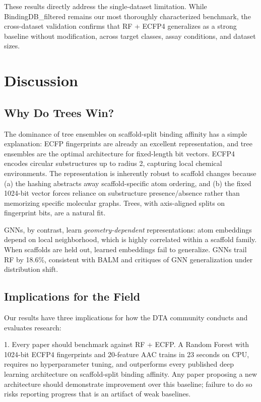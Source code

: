 \documentclass[pmlr,twocolumn]{jmlr}
\begin{document}
These results directly address the single-dataset limitation. While BindingDB\_filtered remains our most thoroughly characterized benchmark, the cross-dataset validation confirms that RF + ECFP4 generalizes as a strong baseline without modification, across target classes, assay conditions, and dataset sizes.

\section{Discussion}

\subsection{Why Do Trees Win?}

The dominance of tree ensembles on scaffold-split binding affinity has a simple explanation: ECFP fingerprints are already an excellent representation, and tree ensembles are the optimal architecture for fixed-length bit vectors. ECFP4 encodes circular substructures up to radius 2, capturing local chemical environments. The representation is inherently robust to scaffold changes because (a) the hashing abstracts away scaffold-specific atom ordering, and (b) the fixed 1024-bit vector forces reliance on substructure presence/absence rather than memorizing specific molecular graphs. Trees, with axis-aligned splits on fingerprint bits, are a natural fit.

GNNs, by contrast, learn \emph{geometry-dependent} representations: atom embeddings depend on local neighborhood, which is highly correlated within a scaffold family. When scaffolds are held out, learned embeddings fail to generalize. GNNs trail RF by 18.6\%, consistent with BALM and critiques of GNN generalization under distribution shift.

\subsection{Implications for the Field}

Our results have three implications for how the DTA community conducts and evaluates research:

1. Every paper should benchmark against RF + ECFP. A Random Forest with 1024-bit ECFP4 fingerprints and 20-feature AAC trains in 23 seconds on CPU, requires no hyperparameter tuning, and outperforms every published deep learning architecture on scaffold-split binding affinity. Any paper proposing a new architecture should demonstrate improvement over this baseline; failure to do so risks reporting progress that is an artifact of weak baselines.
\end{document}
